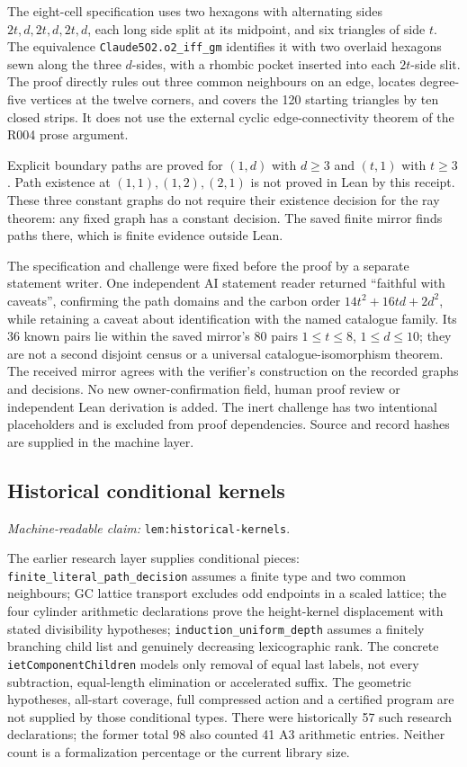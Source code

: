 \documentclass[11pt]{amsart}
\newcommand{\record}[1]{\nolinkurl{#1}}
\newcommand{\claimid}[1]{\par\nopagebreak\noindent\textit{Machine-readable claim:} \record{#1}.\par}
\theoremstyle{definition}\newtheorem{definition}{Definition}
\begin{document}
The eight-cell specification uses two hexagons with alternating sides
$2t,d,2t,d,2t,d$, each long side split at its midpoint, and six triangles
of side $t$. The equivalence \record{Claude5O2.o2_iff_gm} identifies it
with two overlaid hexagons sewn along the three $d$-sides, with a rhombic
pocket inserted into each $2t$-side slit. The proof directly rules out
three common neighbours on an edge, locates degree-five vertices at the
twelve corners, and covers the 120 starting triangles by ten closed
strips. It does not use the external cyclic edge-connectivity theorem
of the R004 prose argument.

Explicit boundary paths are proved for $(1,d)$ with $d\ge3$ and
$(t,1)$ with $t\ge3$. Path existence at $(1,1),(1,2),(2,1)$ is not
proved in Lean by this receipt. These three constant graphs do not
require their existence decision for the ray theorem: any fixed graph
has a constant decision. The saved finite mirror finds paths there,
which is finite evidence outside Lean.

The specification and challenge were fixed before the proof by a
separate statement writer. One independent AI statement reader returned
``faithful with caveats'', confirming the path domains and the carbon
order $14t^2+16td+2d^2$, while retaining a caveat about identification
with the named catalogue family. Its 36 known pairs lie within the
saved mirror's 80 pairs $1\le t\le8$, $1\le d\le10$; they are not
a second disjoint census or a universal catalogue-isomorphism theorem.
The received mirror agrees with the verifier's construction on the
recorded graphs and decisions. No new owner-confirmation field,
human proof review or independent Lean derivation is added. The inert
challenge has two intentional placeholders and is excluded from proof
dependencies. Source and record hashes are supplied in the machine layer.

\subsection{Historical conditional kernels}\label{sec:historical-formal}
\label{lem:historical-kernels}\claimid{lem:historical-kernels}
The earlier research layer supplies conditional pieces:
\record{finite_literal_path_decision} assumes a finite type and two
common neighbours; GC lattice transport excludes odd endpoints in a
scaled lattice; the four cylinder arithmetic declarations prove the
height-kernel displacement with stated divisibility hypotheses;
\record{induction_uniform_depth} assumes a finitely branching child
list and genuinely decreasing lexicographic rank. The concrete
\record{ietComponentChildren} models only removal of equal last labels,
not every subtraction, equal-length elimination or accelerated suffix.
The geometric hypotheses, all-start coverage, full compressed action
and a certified program are not supplied by those conditional types.
There were historically 57 such research declarations; the former
total 98 also counted 41 A3 arithmetic entries. Neither count is a
formalization percentage or the current library size.
\end{document}
